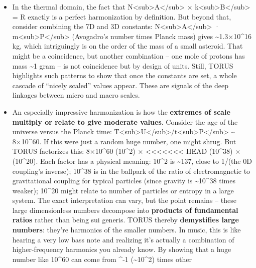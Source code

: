 \documentclass[]{article}
\begin{document}
{\begin{itemize}
  yield clean results rather than awkward residual factors.
\item
  In the thermal domain, the fact that
  N\textless{}sub\textgreater{}A\textless{}/sub\textgreater{} ×
  k\textless{}sub\textgreater{}B\textless{}/sub\textgreater{} = R
  exactly is a perfect harmonization by definition. But beyond that,
  consider combining the 7D and 3D constants:
  N\textless{}sub\textgreater{}A\textless{}/sub\textgreater{} ·
  m\textless{}sub\textgreater{}P\textless{}/sub\textgreater{}
  (Avogadro's number times Planck mass) gives
  \textasciitilde{}1.3×10\^{}16 kg​, which intriguingly is on the order
  of the mass of a small asteroid. That might be a coincidence, but
  another combination -- one mole of protons has mass \textasciitilde{}1
  gram -- is not coincidence but by design of units. Still, TORUS
  highlights such patterns to show that once the constants are set, a
  whole cascade of ``nicely scaled'' values appear. These are signals of
  the deep linkages between micro and macro scales.
\item
  An especially impressive harmonization is how the \textbf{extremes of
  scale multiply or relate to give moderate values}. Consider the age of
  the universe versus the Planck time:
  T\textless{}sub\textgreater{}U\textless{}/sub\textgreater{}/t\textless{}sub\textgreater{}P\textless{}/sub\textgreater{}
  \textasciitilde{} 8×10\^{}60. If this were just a random huge number,
  one might shrug. But TORUS factorizes this: 8×10\^{}60 \approx (10\^{}2) ×
<<<<<<< HEAD
  (10\^{}38) × (10\^{}20)\hspace{0pt}. Each factor has a physical
  meaning: 10\^{}2 is \textasciitilde137, close to 1/\alpha (the 0D
  coupling's inverse)\hspace{0pt}; 10\^{}38 is in the ballpark of the
  ratio of electromagnetic to gravitational coupling for typical
  particles (since gravity is \textasciitilde10\^{}38 times
  weaker)\hspace{0pt}; 10\^{}20 might relate to number of particles or
  entropy in a large system. The exact interpretation can vary, but the
  point remains -- these large dimensionless numbers decompose into
  \textbf{products of fundamental ratios} rather than being sui generis.
  TORUS thereby \textbf{demystifies large numbers}: they're harmonics of
  the smaller numbers. In music, this is like hearing a very low bass
  note and realizing it's actually a combination of higher-frequency
  harmonics you already know. By showing that a huge number like
  10\^{}60 can come from \alpha\^{}-1 (\textasciitilde10\^{}2) times other

\end{itemize}}
\end{document}
